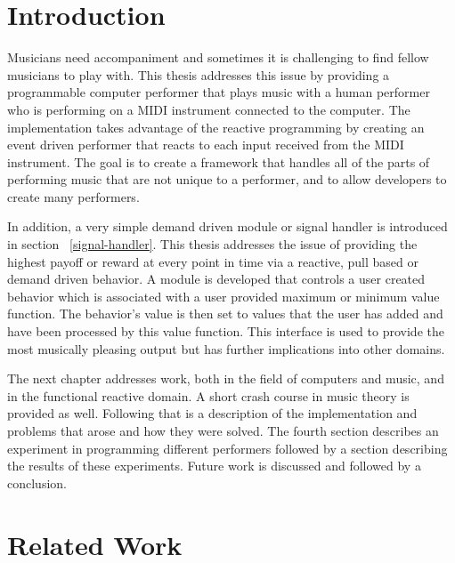 \documentclass[12pt]{ucthesis}
\begin{document}




\chapter{Introduction}
\label{intro}

Musicians need accompaniment and sometimes it is challenging to find fellow musicians to play with. This thesis addresses this issue by providing a programmable computer performer that plays music with a human performer who is performing on a MIDI instrument connected to the computer. The implementation takes advantage of the reactive programming by creating an event driven performer that reacts to each input received from the MIDI instrument. The goal is to create a framework that handles all of the parts of performing music that are not unique to a performer, and to allow developers to create many performers. 

In addition, a very simple demand driven module or signal handler is introduced in section ~\ref{signal-handler}. This thesis addresses the issue of providing the highest payoff or reward at every point in time via a reactive, pull based or demand driven behavior. A module is developed that controls a user created behavior which is associated with a user provided maximum or minimum value function. The behavior's value is then set to values that the user has added and have been processed by this value function. This interface is used to provide the most musically pleasing output but has further implications into other domains. 

The next chapter addresses work, both in the field of computers and music, and in the functional reactive domain. A short crash course in music theory is provided as well. Following that is a description of the implementation and problems that arose and how they were solved. The fourth section describes an experiment in programming different performers followed by a section describing the results of these experiments. Future work is discussed and followed by a conclusion.

\chapter{Related Work}
\label{rw}
\end{document}
